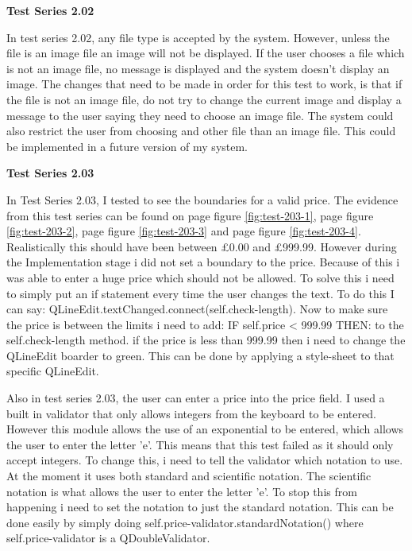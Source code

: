 \textbf{Test Series 2.02}

In test series 2.02, any file type is accepted by the system. However, unless the file is an image file an image will not be displayed. If the user chooses a file which is not an image file, no message is displayed and the system doesn't display an image. The changes that need to be made in order for this test to work, is that if the file is not an image file, do not try to change the current image and display a message to the user saying they need to choose an image file. The system could also restrict the user from choosing and other file than an image file. This could be implemented in a future version of my system.

\textbf{Test Series 2.03}

In Test Series 2.03, I tested to see the boundaries for a valid price. The evidence from this test series can be found on  page \pageref{fig:test-203-1} figure \ref{fig:test-203-1}, page \pageref{fig:test-203-2} figure \ref{fig:test-203-2}, page \pageref{fig:test-203-3} figure \ref{fig:test-203-3} and page \pageref{fig:test-203-4} figure \ref{fig:test-203-4}. Realistically this should have been between £0.00 and £999.99. However during the Implementation stage i did not set a boundary to the price. Because of this i was able to enter a huge price which should not be allowed. To solve this i need to simply put an if statement every time the user changes the text. To do this I can say: QLineEdit.textChanged.connect(self.check-length). Now to make sure the price is between the limits i need to add: IF self.price < 999.99 THEN: to the self.check-length method. if the price is less than 999.99 then i need to change the QLineEdit boarder to green. This can be done by applying a style-sheet to that specific QLineEdit.

Also in test series 2.03, the user can enter a price into the price field. I used a built in validator that only allows integers from the keyboard to be entered. However this module allows the use of an exponential to be entered, which allows the user to enter the letter 'e'. This means that this test failed as it should only accept integers. To change this, i need to tell the validator which notation to use. At the moment it uses both standard and scientific notation. The scientific notation is what allows the user to enter the letter 'e'. To stop this from happening i need to set the notation to just the standard notation. This can be done easily by simply doing self.price-validator.standardNotation() where self.price-validator is a QDoubleValidator.

